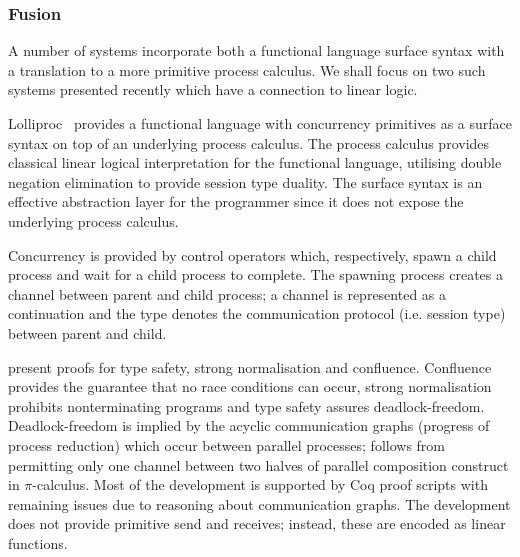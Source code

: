 \documentclass{mprop}
\newcommand{\1}{\textbf{1}\xspace}
\begin{document}
\subsubsection{Fusion}

A number of systems incorporate both a functional language surface syntax with a translation to a more primitive process calculus. We shall focus on two such systems presented recently which have a connection to linear logic.

Lolliproc~\cite{Mazurak:2010:LCC} provides a functional language with concurrency primitives as a surface syntax on top of an underlying process calculus. The process calculus provides classical linear logical interpretation for the functional language, utilising double negation elimination to provide session type duality. The surface syntax is an effective abstraction layer for the programmer since it does not expose the underlying process calculus.

Concurrency is provided by control operators which, respectively, spawn a child process and wait for a child process to complete. The spawning process creates a channel between parent and child process; a channel is represented as a continuation and the type denotes the communication protocol (i.e. session type) between parent and child.

\citeauthor{Mazurak:2010:LCC} present proofs for type safety, strong normalisation and confluence. Confluence provides the guarantee that no race conditions can occur, strong normalisation prohibits nonterminating programs and type safety assures deadlock-freedom. Deadlock-freedom is implied by the acyclic communication graphs (progress of process reduction) which occur between parallel processes; follows from permitting only one channel between two halves of parallel composition construct in $\pi$-calculus. Most of the development is supported by Coq proof scripts with remaining issues due to reasoning about communication graphs. The development does not provide primitive send and receives; instead, these are encoded as linear functions. 
\end{document}
